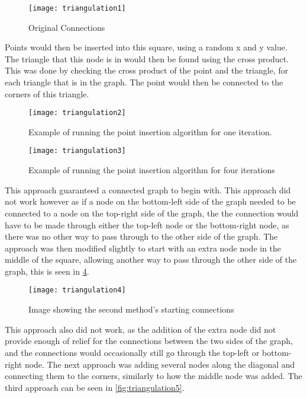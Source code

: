 \begin{figure}[H]
	\texttt{[image: triangulation1]}
	\centering
	\caption{Original Connections}
	\label{fig:triangulation1}
\end{figure}

	Points would then be inserted into this square, using a random x and y value.  The triangle that this node is in would then be found using the cross product. This was done by checking the cross product of the point and the triangle, for each triangle that is in the graph. The point would then be connected to the corners of this triangle.\\

\begin{figure}[H]
	\texttt{[image: triangulation2]}
	\centering
	\caption{Example of running the point insertion algorithm for one iteration.}
	\label{fig:triangulation2}
\end{figure}

\begin{figure}[h]
	\texttt{[image: triangulation3]}
	\centering
	\caption{Example of running the point insertion algorithm for four iterations}
	\label{fig:triangulation3}
\end{figure}

	This approach guaranteed a connected graph to begin with. This approach did not work however as if a node on the bottom-left side of the graph needed to be connected to a node on the top-right side of the graph, the the connection would have to be made through either the top-left node or the bottom-right node, as there was no other way to pass through to the other side of the graph. The approach was then modified slightly to start with an extra node node in the middle of the square, allowing another way to pass through the other side of the graph, this is seen in \ref{fig:triangulation4}.

\begin{figure}[H]
	\texttt{[image: triangulation4]}
	\centering
	\caption{Image showing the second method's starting connections}
	\label{fig:triangulation4}
\end{figure}
	
	This approach also did not work, as the addition of the extra node did not provide enough of relief for the connections between the two sides of the graph, and the connections would occasionally still go through the top-left or bottom-right node.
The next approach was adding several nodes along the diagonal and connecting them to the corners, similarly to how the middle node was added. The third approach can be seen in \ref{fig:triangulation5}.

